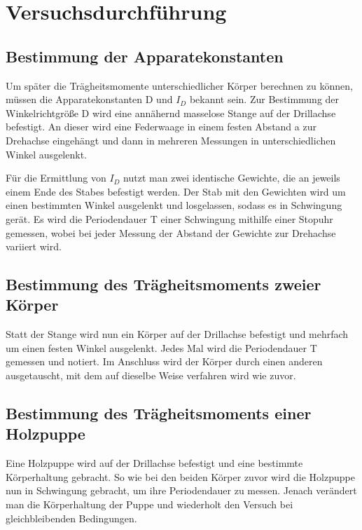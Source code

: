 \section{Versuchsdurchführung}
\subsection{Bestimmung der Apparatekonstanten}
Um später die Trägheitsmomente unterschiedlicher Körper berechnen zu können, müssen die Apparatekonstanten D und $I_D$ bekannt sein.
Zur Bestimmung der Winkelrichtgröße D wird eine annähernd masselose Stange auf der Drillachse befestigt. An dieser wird eine Federwaage
in einem festen Abstand a zur Drehachse eingehängt und dann in mehreren Messungen in unterschiedlichen Winkel ausgelenkt.

Für die Ermittlung von $I_D$ nutzt man zwei identische Gewichte, die an jeweils einem Ende des Stabes befestigt werden.
Der Stab mit den Gewichten wird um einen bestimmten Winkel ausgelenkt und losgelassen, sodass es in Schwingung gerät.
Es wird die Periodendauer T einer Schwingung mithilfe einer Stopuhr gemessen, wobei bei jeder Messung der Abstand der Gewichte zur
Drehachse variiert wird.

\subsection{Bestimmung des Trägheitsmoments zweier Körper}
Statt der Stange wird nun ein Körper auf der Drillachse befestigt und mehrfach um einen festen Winkel ausgelenkt. Jedes Mal wird 
die Periodendauer T gemessen und notiert. Im Anschluss wird der Körper durch einen anderen ausgetauscht, mit dem auf dieselbe 
Weise verfahren wird wie zuvor.

\subsection{Bestimmung des Trägheitsmoments einer Holzpuppe}
Eine Holzpuppe wird auf der Drillachse befestigt und eine bestimmte Körperhaltung gebracht. So wie bei den beiden Körper zuvor
wird die Holzpuppe nun in Schwingung gebracht, um ihre Periodendauer zu messen. Jenach verändert man die Körperhaltung der Puppe
und wiederholt den Versuch bei gleichbleibenden Bedingungen.
